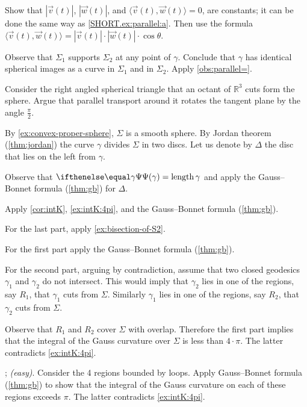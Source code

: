 \parit{\ref{SHORT.ex:parallel:b}}
Show that $|\vec v(t)|$, $|\vec w(t)|$, and
$\langle\vec v(t),\vec w(t)\rangle=0$,
are constants; it can be done the same way as \ref{SHORT.ex:parallel:a}.
Then use the formula 
$\langle\vec v(t),\vec w(t)\rangle=|\vec v(t)|\cdot|\vec w(t)|\cdot\cos\theta$.

\setcounter{eqtn}{0}

Observe that $\Sigma_1$ supports $\Sigma_2$ at any point of $\gamma$.
Conclude that $\gamma$ has identical spherical images as a curve in $\Sigma_1$ and in $\Sigma_2$.
Apply \ref{obs:parallel=}.

Consider the right angled spherical triangle that an octant of $\mathbb{R}^3$ cuts form the sphere.
Argue that parallel transport around it rotates the tangent plane by the angle $\tfrac\pi 2$. 

\setcounter{eqtn}{0}

By \ref{ex:convex-proper-sphere}, $\Sigma$ is a smooth sphere.
By Jordan theorem (\ref{thm:jordan}) the curve $\gamma$ divides $\Sigma$  in two discs.
Let us denote by $\Delta$ the disc that lies on the left from $\gamma$.

Observe that $\tgc\gamma=\length\gamma$ and apply  the Gauss--Bonnet formula (\ref{thm:gb}) for $\Delta$.

Apply \ref{cor:intK}, \ref{ex:intK:4pi}, and the Gauss--Bonnet formula (\ref{thm:gb}).

For the last part, apply \ref{ex:bisection-of-S2}.

 For the first part apply the Gauss--Bonnet formula (\ref{thm:gb}).

For the second part, arguing by contradiction, assume that two closed geodesics $\gamma_1$ and $\gamma_2$ do not intersect. 
This would imply that $\gamma_2$ lies in one of the regions, say $R_1$, that $\gamma_1$ cuts  from $\Sigma$.
Similarly $\gamma_1$ lies in one of the regions, say $R_2$, that $\gamma_2$ cuts  from $\Sigma$.

Observe that $R_1$ and $R_2$ cover $\Sigma$ with overlap.
Therefore the first part implies that the integral of the Gauss curvature over $\Sigma$ is less than $4\cdot\pi$.
The latter contradicts \ref{ex:intK:4pi}.

\parbf{\ref{ex:self-intersections}}; \textit{(easy)}.
Consider the 4 regions bounded by loops.
Apply Gauss--Bonnet formula (\ref{thm:gb}) to show that the integral of the Gauss curvature on each of these regions exceeds $\pi$.
The latter contradicts \ref{ex:intK:4pi}.

